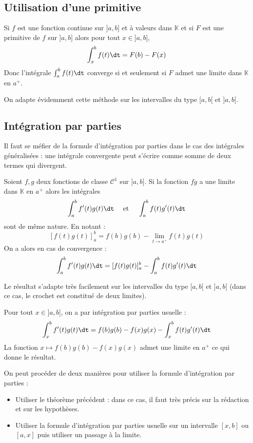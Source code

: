 \documentclass[a4paper,10pt]{report}
\begin{document}
\subsection{Utilisation d'une primitive}
\noindent Si $f$ est une fonction continue sur $]a,b]$ et à valeurs dans $\mathbb{K}$ et si $F$ est une primitive de $f$ sur $]a,b]$ alors pour tout $x \in ]a,b]$,
$$ \int_{x}^b f(t) \dt = F(b)-F(x)$$
Donc l'intégrale $\int_{a}^b f(t) \dt$ converge si et seulement si $F$ admet une limite dans $\mathbb{K}$ en $a^{+}$.

\medskip

\noindent On adapte évidemment cette méthode sur les intervalles du type $[a,b[$ et $]a,b[$.
\subsection{Intégration par parties}

\noindent Il faut se méfier de la formule d'intégration par parties dans le cas des intégrales généralisées : une intégrale convergente peut s'écrire comme somme de deux termes qui divergent.

\begin{thm} Soient $f,g$ deux fonctions de classe $\mathcal{C}^1$ sur $]a,b]$. Si la fonction $fg$ a une limite dans $\mathbb{K}$ en $a^+$ alors les intégrales 
$$ \int_{a}^{b} f'(t) g(t) \dt \quad \hbox{ et } \quad \int_{a}^{b} f(t) g'(t) \dt $$
sont de même nature. En notant :
$$ [f(t) g(t)]_{a}^{b} = f(b)g(b) - \lim_{t \rightarrow a^+} f(t)g(t)$$
On a alors en cas de convergence :
$$  \int_{a}^{b} f'(t) g(t) \dt = [f(t) g(t)]_{a}^{b} - \int_{a}^b f(t) g'(t) \dt$$
\end{thm}

\begin{rem} Le résultat s'adapte très facilement sur les intervalles du type $[a,b[$ et $]a,b[$ (dans ce cas, le crochet est constitué de deux limites).
\end{rem}

\begin{preuve} Pour tout $x \in ]a,b]$, on a par intégration par parties \og usuelle \fg :
$$ \int_{x}^{b} f'(t) g(t) \dt = f(b)g(b)-f(x)g(x) - \int_{x}^b f(t) g'(t) \dt$$
La fonction $x \mapsto f(b)g(b)-f(x)g(x)$ admet une limite en $a^+$ ce qui donne le résultat.
\end{preuve}

\medskip

\begin{rem} On peut procéder de deux manières pour utiliser la formule d'intégration par parties :

\begin{itemize}
\item Utiliser le théorème précédent : dans ce cas, il faut très précis sur la rédaction et sur les hypothèses.
\item Utiliser la formule d'intégration par parties usuelle sur un intervalle $[x,b]$ ou $[a,x]$ puis utiliser un passage à la limite.
\end{itemize}
\end{rem}
\end{document}
